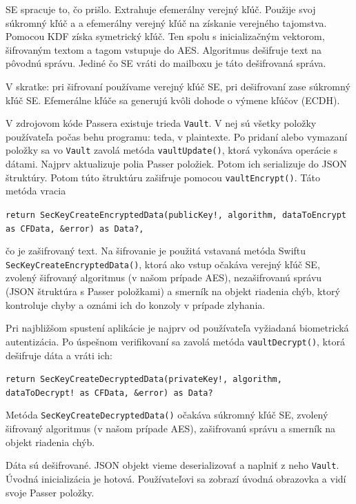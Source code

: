SE spracuje to, čo prišlo. Extrahuje efemerálny verejný kľúč. Použije svoj súkromný kľúč a a efemerálny verejný kľúč na získanie verejného tajomstva. Pomocou KDF získa symetrický kľúč. Ten spolu s inicializačným vektorom, šifrovaným textom a tagom vstupuje do AES. Algoritmus dešifruje text na pôvodnú správu. Jediné čo SE vráti do mailboxu je táto dešifrovaná správa.

V skratke: pri šifrovaní používame verejný kľúč SE, pri dešifrovaní zase súkromný kľúč SE. Efemerálne kľúče sa generujú kvôli dohode o výmene kľúčov (ECDH). 

V zdrojovom kóde Passera existuje trieda \texttt{Vault}. V nej sú všetky položky používateľa počas behu programu: teda, v plaintexte. Po pridaní alebo vymazaní položky sa vo \texttt{Vault} zavolá metóda \texttt{vaultUpdate()}, ktorá vykonáva operácie s dátami. Najprv aktualizuje polia Passer položiek. Potom ich serializuje do JSON štruktúry. Potom túto štruktúru zašifruje pomocou \texttt{vaultEncrypt()}. Táto metóda vracia 
\begin{center}
    \texttt{return SecKeyCreateEncryptedData(publicKey!, algorithm, dataToEncrypt as CFData, \&error) as Data?,}
\end{center}
\begin{sloppypar}
    \noindent čo je zašifrovaný text. Na šifrovanie je použitá vstavaná metóda Swiftu \texttt{SecKeyCreateEncryptedData()}, ktorá ako vstup očakáva verejný kľúč SE, zvolený šifrovaný algoritmus (v našom prípade AES), nezašifrovanú správu (JSON štruktúra s Passer položkami) a smerník na objekt riadenia chýb, ktorý kontroluje chyby a oznámi ich do konzoly v prípade zlyhania.
\end{sloppypar}

Pri najbližšom spustení aplikácie je najprv od používateľa vyžiadaná biometrická autentizácia. Po úspešnom verifikovaní sa zavolá metóda \texttt{vaultDecrypt()}, ktorá dešifruje dáta a vráti ich: 
\begin{center}
    \texttt{return SecKeyCreateDecryptedData(privateKey!, algorithm, dataToDecrypt! as CFData, \&error) as Data?}
\end{center}
\begin{sloppypar}
    \noindent Metóda \texttt{SecKeyCreateDecryptedData()} očakáva súkromný kľúč SE, zvolený šifrovaný algoritmus (v našom prípade AES), zašifrovanú správu a smerník na objekt riadenia chýb.
\end{sloppypar}

Dáta sú dešifrované. JSON objekt vieme deserializovať a naplniť z neho \texttt{Vault}. Úvodná inicializácia je hotová. Používateľovi sa zobrazí úvodná obrazovka a vidí svoje Passer položky. 

